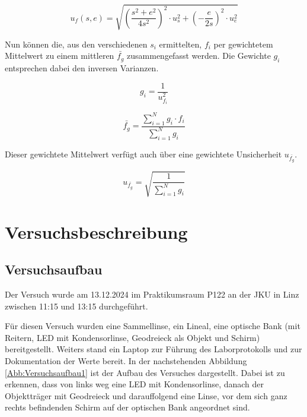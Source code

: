 \documentclass[a4paper,12pt]{article}
\begin{document}
\begin{equation}
    \label{eq:BesselBrennwUnsFortpfl}
    u_f(s,e) = \sqrt{\left(\frac{s^2+e^2}{4s^2}\right)^2 \cdot u_s^2 + \left(-\frac{e}{2s}\right)^2 \cdot u_e^2}
\end{equation}

Nun können die, aus den verschiedenen $s_i$ ermittelten, $f_i$ per gewichtetem Mittelwert zu einem
mittleren $\bar{f_g}$ zusammengefasst werden. Die Gewichte $g_i$ entsprechen dabei den inversen
Varianzen.

\begin{equation}
    \label{eq:Gewicht}
    g_i = \frac{1}{u_{f_i}^2}
\end{equation}

\begin{equation}
    \label{eq:Mittelwert}
    \bar{f_g} = \frac{\sum_{i=1}^{N} g_i \cdot f_i}{\sum_{i=1}^{N} g_i}
\end{equation}

Dieser gewichtete Mittelwert verfügt auch über eine gewichtete Unsicherheit $u_{\bar{f_g}}$.

\begin{equation}
    \label{eq:GewichtUnsicherheit}
    u_{\bar{f_g}} = \sqrt{\frac{1}{\sum_{i=1}^{N} g_i}}
\end{equation}

\section{Versuchsbeschreibung}
\subsection{Versuchsaufbau}

Der Versuch wurde am 13.12.2024 im Praktikumsraum P122 an der JKU in Linz zwischen 11:15 und
13:15 durchgeführt.

Für diesen Versuch wurden eine Sammellinse, ein Lineal, eine optische Bank (mit Reitern, LED
mit Kondensorlinse, Geodreieck als Objekt und Schirm) bereitgestellt.
Weiters stand ein Laptop zur Führung des Laborprotokolls und zur Dokumentation der Werte bereit.
In der nachstehenden Abbildung \ref{Abb:Versuchsaufbau1} ist der Aufbau des Versuches dargestellt.
Dabei ist zu erkennen, dass von links weg eine LED mit Kondensorlinse, danach der Objektträger
mit Geodreieck und darauffolgend eine Linse, vor dem sich ganz rechts befindenden Schirm auf der
optischen Bank angeordnet sind.
\end{document}
